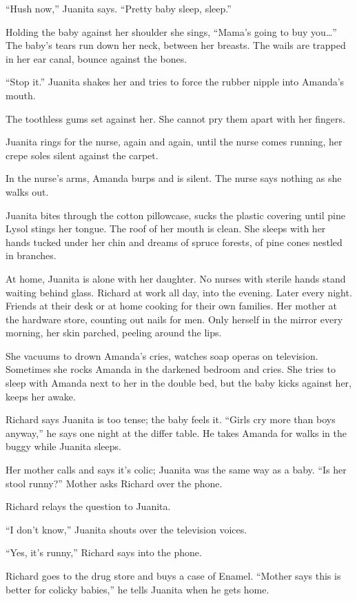 \documentclass[twoside,10pt]{book}
\begin{document}
``Hush now,'' Juanita says. ``Pretty baby sleep, sleep.''

Holding the baby against her shoulder she sings, ``Mama's going to buy
you\ldots'' The baby's tears run down her neck, between her breasts. The
wails are trapped in her ear canal, bounce against the bones.

``Stop it.'' Juanita shakes her and tries to force the rubber nipple
into Amanda's mouth.

The toothless gums set against her. She cannot pry them apart with her
fingers.

Juanita rings for the nurse, again and again, until the nurse comes
running, her crepe soles silent against the carpet.

In the nurse's arms, Amanda burps and is silent. The nurse says nothing
as she walks out.

Juanita bites through the cotton pillowcase, sucks the plastic covering
until pine Lysol stings her tongue. The roof of her mouth is clean. She
sleeps with her hands tucked under her chin and dreams of spruce
forests, of pine cones nestled in branches.

At home, Juanita is alone with her daughter. No nurses with sterile
hands stand waiting behind glass. Richard at work all day, into the
evening. Later every night. Friends at their desk or at home cooking for
their own families. Her mother at the hardware store, counting out nails
for men. Only herself in the mirror every morning, her skin parched,
peeling around the lips.

She vacuums to drown Amanda's cries, watches soap operas on television.
Sometimes she rocks Amanda in the darkened bedroom and cries. She tries
to sleep with Amanda next to her in the double bed, but the baby kicks
against her, keeps her awake.

Richard says Juanita is too tense; the baby feels it. ``Girls cry more
than boys anyway,'' he says one night at the differ table. He takes
Amanda for walks in the buggy while Juanita sleeps.

Her mother calls and says it's colic; Juanita was the same way as a
baby. ``Is her stool runny?'' Mother asks Richard over the phone.

Richard relays the question to Juanita.

``I don't know,'' Juanita shouts over the television voices.

``Yes, it's runny,'' Richard says into the phone.

Richard goes to the drug store and buys a case of Enamel. ``Mother says
this is better for colicky babies,'' he tells Juanita when he gets home.
\end{document}
